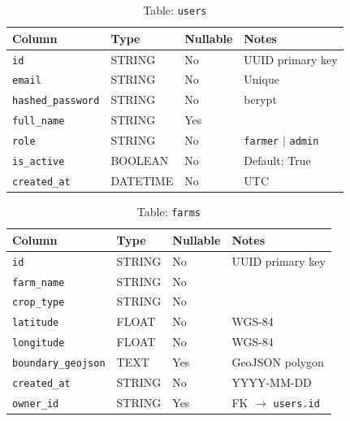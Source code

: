 \documentclass[12pt,a4paper,oneside]{report}
\begin{document}
\begin{table}[h]\centering\caption{Table: \texttt{users}}
\begin{tabular}{llll}\toprule\textbf{Column}&\textbf{Type}&\textbf{Nullable}&\textbf{Notes}\\\midrule
\texttt{id}               &STRING  &No &UUID primary key\\
\texttt{email}            &STRING  &No &Unique\\
\texttt{hashed\_password} &STRING  &No &bcrypt\\
\texttt{full\_name}       &STRING  &Yes&\\
\texttt{role}             &STRING  &No &\texttt{farmer} $|$ \texttt{admin}\\
\texttt{is\_active}       &BOOLEAN &No &Default: True\\
\texttt{created\_at}      &DATETIME&No &UTC\\\bottomrule\end{tabular}\end{table}

\begin{table}[h]\centering\caption{Table: \texttt{farms}}
\begin{tabular}{llll}\toprule\textbf{Column}&\textbf{Type}&\textbf{Nullable}&\textbf{Notes}\\\midrule
\texttt{id}                &STRING&No &UUID primary key\\
\texttt{farm\_name}        &STRING&No &\\
\texttt{crop\_type}        &STRING&No &\\
\texttt{latitude}          &FLOAT &No &WGS-84\\
\texttt{longitude}         &FLOAT &No &WGS-84\\
\texttt{boundary\_geojson} &TEXT  &Yes&GeoJSON polygon\\
\texttt{created\_at}       &STRING&No &YYYY-MM-DD\\
\texttt{owner\_id}         &STRING&Yes&FK $\to$ \texttt{users.id}\\\bottomrule\end{tabular}\end{table}
\end{document}
